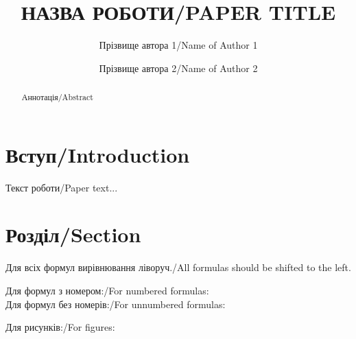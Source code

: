 \documentclass[fleqn,twoside,twocolumn,nofootinbib,showkeys]{revtex4} %
\begin{document}
	\title[Колонтитул: Назва роботи (3-5 слів)/Headline: paper title (3-5 words)]%
	{НАЗВА РОБОТИ/PAPER TITLE}%
	\author{Прізвище автора 1/Name of Author 1}%
	\address{14b, Metrolohichna Str., Kyiv 03143, Ukraine}%
	\author{Прізвище автора 2/Name of Author 2}%
	\address{Middelheimlaan 1, Antwerpen 2020, Belgium}%
	
	 \razd{\secix}
	
	
	\setcounter{page}{1}%
	
	\begin{abstract}
		Аннотація/Abstract
	\end{abstract}
	
	
	\maketitle
	
	\section{Вступ/Introduction}
	
	Текст роботи/Paper text...
	
	\section{Розділ/Section}
	
	Для всіх формул вирівнювання ліворуч./All formulas should be shifted to the left.
	
	Для формул з номером:/For numbered formulas:
	\begin{equation}
	\end{equation}
	Для формул без номерів:/For unnumbered formulas:
	\[
	\]
	
	Для рисунків:/For figures:%
	
	\begin{figure}%
		\vskip1mm
		\vskip-3mm\caption{  }
	\end{figure}
	
\end{document}
